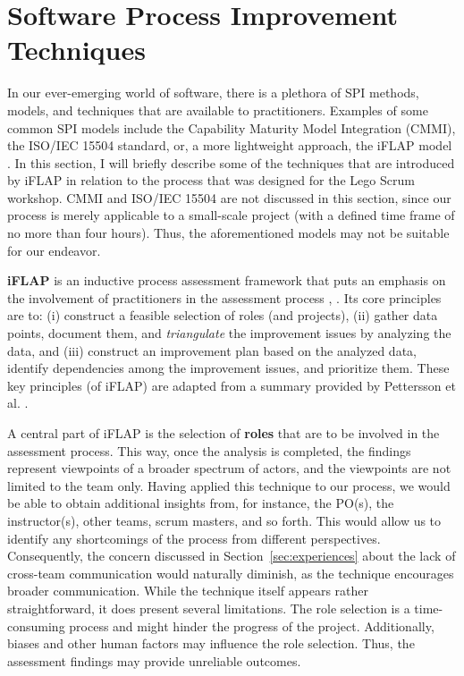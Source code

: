 \documentclass[conference]{IEEEtran}
\begin{document}
\section{Software Process Improvement Techniques}
\label{sec:spi-techniques}


In our ever-emerging world of software, there is a plethora of SPI methods,
models, and techniques that are available to practitioners. Examples of some
common SPI models include the Capability Maturity Model Integration (CMMI), the
ISO/IEC 15504 standard, or, a more lightweight approach, the iFLAP model
\cite{Pettersson2008}. In this section, I will briefly describe some of the
techniques that are introduced by iFLAP in relation to the process that was
designed for the Lego Scrum workshop. CMMI and ISO/IEC 15504 are not discussed
in this section, since our process is merely applicable to a small-scale
project (with a defined time frame of no more than four hours). Thus, the
aforementioned models may not be suitable for our endeavor.

\textbf{{\selectfont iFLAP}} is an inductive process assessment
framework that puts an emphasis on the involvement of practitioners in the
assessment process \cite{Pettersson2008}, \cite{Malvius2009}. Its core
principles are to: (i) construct a feasible selection of roles (and projects),
(ii) gather data points, document them, and \textit{triangulate} the
improvement issues by analyzing the data, and (iii) construct an improvement
plan based on the analyzed data, identify dependencies among the improvement
issues, and prioritize them. These key principles (of iFLAP) are adapted from a
summary provided by Pettersson et al. \cite{Pettersson2008}.

A central part of iFLAP is the selection of \textbf{roles} that are to be
involved in the assessment process. This way, once the analysis is completed,
the findings represent viewpoints of a broader spectrum of actors, and the
viewpoints are not limited to the team only. Having applied this technique to
our process, we would be able to obtain additional insights from, for instance,
the PO(s), the instructor(s), other teams, scrum masters, and so forth. This
would allow us to identify any shortcomings of the process from different
perspectives. Consequently, the concern discussed in
Section~\ref{sec:experiences} about the lack of cross-team communication would
naturally diminish, as the technique encourages broader communication. While
the technique itself appears rather straightforward, it does present several
limitations. The role selection is a time-consuming process and might hinder
the progress of the project. Additionally, biases and other human factors may
influence the role selection. Thus, the assessment findings may provide
unreliable outcomes.
\end{document}
